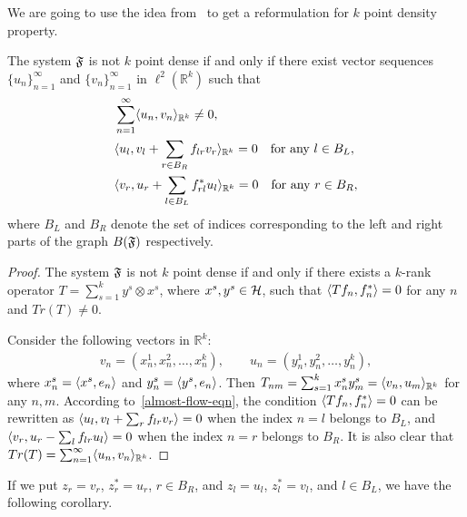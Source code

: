 \documentclass[12pt,oneside,a4paper]{amsart}
\begin{document}
      We are going to use the idea from~\cite{me} to get a reformulation for $k$ point density property.
      \begin{prop}
        \label{prop-vec-est}
        The system $\fsys$ is not $k$ point dense if and only if there exist vector sequences
          $\{u_n\}_{n=1}^\infty$ and $\{v_n\}_{n=1}^\infty$ in $\ell^2 (\mathbb{R}^k)$ such that
        \begin{align*}
          &\sum_{n=1}^\infty \inner{u_n}{v_n}_{\mathbb{R}^k} \neq 0,\\
          &\inner{u_l}{v_l + \sum_{r \in B_R} f_{lr} v_r}_{\mathbb{R}^k} = 0 \quad \text{for any $l \in B_L$},\\
          &\inner{v_r}{u_r + \sum_{l \in B_L} f_{rl}^* u_l}_{\mathbb{R}^k} = 0 \quad \text{for any $r \in B_R$},
        \end{align*}
        where $B_L$ and $B_R$ denote the set of indices corresponding to the left and right parts of the graph $B(\fsys)$ respectively.
      \end{prop}
      \begin{proof}
        The system $\fsys$ is not $k$ point dense if and only if there exists a $k$-rank operator $T = \sum_{s=1}^k y^s \otimes x^s$, where $x^s, y^s \in \cal{H}$, such that $\inner{Tf_n}{f_n^*} = 0$ for any $n$ and $Tr(T) \neq 0$.

        Consider the following vectors in $\mathbb{R}^k$:
        \begin{align*}
          v_n = (x^1_n, x^2_n, \dots, x^k_n),\qquad
          u_n = (y^1_n, y^2_n, \dots, y^k_n),
        \end{align*}
          where $x^s_n = \inner{x^s}{e_n}$ and $y^s_n = \inner{y^s}{e_n}$.
        Then $T_{nm} = \sum_{s=1}^k  x^s_n y^s_m = \inner{v_n}{u_m}_{\mathbb{R}^k}$ for any $n, m$.
        According to~\eqref{almost-flow-eqn}, the condition $\inner{Tf_n}{f^*_n} = 0$ can be rewritten as
          $\inner{u_l}{v_l + \sum_r f_{lr} v_r} = 0$
        when the index $n=l$ belongs to $B_L$, and
          $\inner{v_r}{u_r - \sum_l f_{lr} u_l} = 0$
        when the index $n=r$ belongs to $B_R$.
        It is also clear that
          $Tr(T) = \sum_{n=1}^\infty \inner{u_n}{v_n}_{\mathbb{R}^k}$. 
      \end{proof}
      If we put $z_r = v_r$, $z_r^*=u_r$, $r \in B_R$, and $z_l = u_l$, $z^*_l=v_l$, and $l \in B_L$, we have the following corollary.
\end{document}
